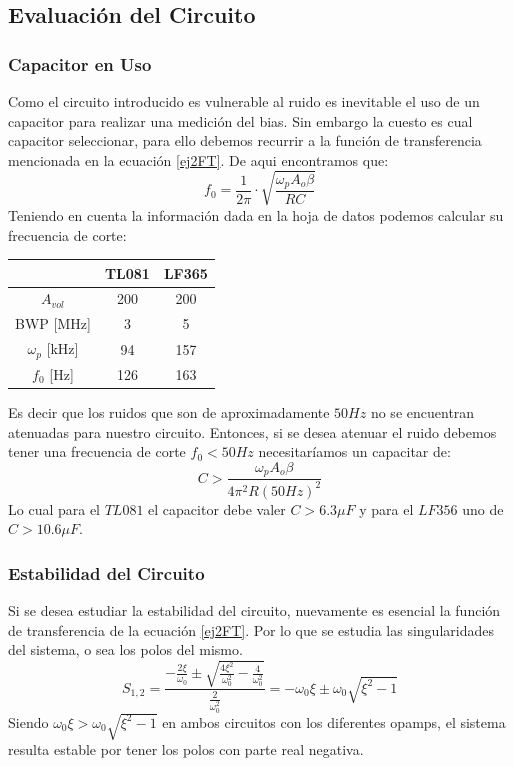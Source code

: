 \subsection{Evaluación del Circuito}

\subsubsection{Capacitor en Uso}

Como el circuito introducido es vulnerable al ruido es inevitable el uso de un capacitor para realizar una medición del bias. Sin embargo la cuesto es cual capacitor seleccionar, para ello debemos recurrir a la función de transferencia mencionada en la ecuación \ref{ej2FT}. De aqui encontramos que:
$$f_0=\frac{1}{2\pi}\cdot \sqrt{\frac{\omega_pA_o\beta}{RC}}$$
Teniendo en cuenta la información dada en la hoja de datos podemos calcular su frecuencia de corte:
\begin{table}[h]
\centering
\begin{tabular}{@{}ccc@{}}
\toprule
\textbf{}     & \textbf{TL081} & \textbf{LF365} \\ \midrule
$A_{vol}$          & 200            & 200            \\
BWP {[}MHz{]} & 3              & 5              \\
$\omega_p$ {[}kHz{]}   & 94             & 157            \\ \midrule
$f_0$ {[}Hz{]}    & 126            & 163           \\
\hline
\end{tabular}
\end{table}

Es decir que los ruidos que son de aproximadamente $50Hz$ no se encuentran atenuadas para nuestro circuito. Entonces, si se desea atenuar el ruido debemos tener una frecuencia de corte $f_0<50Hz$ necesitaríamos un capacitar de: 
$$C>\frac{\omega_pA_o\beta}{4\pi^2R(50Hz)^2}$$
Lo cual para el $TL081$ el capacitor debe valer $C > 6.3\mu F$ y para el $LF356$ uno de $C>10.6\mu F$.
 
\subsubsection{Estabilidad del Circuito}

Si se desea estudiar la estabilidad del circuito, nuevamente es esencial la función de transferencia de la ecuación \ref{ej2FT}. Por lo que se estudia las singularidades del sistema, o sea los polos del mismo.
$$S_{1,2} = \frac{-\frac{2\xi}{\omega_0}\pm\sqrt{\frac{4\xi^2}{\omega_0^2}-\frac{4}{\omega_0^2}}}{\frac{2}{\omega_0^2}}=-\omega_0\xi \pm {\omega_0}\sqrt{\xi^2-1}$$
Siendo $\omega_0\xi > {\omega_0}\sqrt{\xi^2-1}$ en ambos circuitos con los diferentes opamps, el sistema resulta estable por tener los polos con parte real negativa. 

